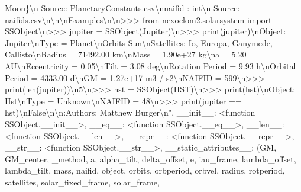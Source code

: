 \documentclass[letterpaper,10pt,english]{sphinxmanual}
\begin{document}
\begin{fulllineitems}
\begin{fulllineitems}
\textquotesingle{}Moon\textquotesingle{}\}\textbackslash{}n    Source: PlanetaryConstants.csv\textbackslash{}nnaifid : int\textbackslash{}n    Source: naifids.csv\textbackslash{}n\textbackslash{}n\textbackslash{}nExamples\textbackslash{}n\sphinxhyphen{}\sphinxhyphen{}\sphinxhyphen{}\sphinxhyphen{}\sphinxhyphen{}\sphinxhyphen{}\sphinxhyphen{}\sphinxhyphen{}\textbackslash{}n\textgreater{}\textgreater{}\textgreater{} from nexoclom2.solarsystem import SSObject\textbackslash{}n\textgreater{}\textgreater{}\textgreater{} jupiter = SSObject(\textquotesingle{}Jupiter\textquotesingle{})\textbackslash{}n\textgreater{}\textgreater{}\textgreater{} print(jupiter)\textbackslash{}nObject: Jupiter\textbackslash{}nType = Planet\textbackslash{}nOrbits Sun\textbackslash{}nSatellites: Io, Europa, Ganymede, Callisto\textbackslash{}nRadius = 71492.00 km\textbackslash{}nMass = 1.90e+27 kg\textbackslash{}na = 5.20 AU\textbackslash{}nEccentricity = 0.05\textbackslash{}nTilt = 3.08 deg\textbackslash{}nRotation Period = 9.93 h\textbackslash{}nOrbital Period = 4333.00 d\textbackslash{}nGM = \sphinxhyphen{}1.27e+17 m3 / s2\textbackslash{}nNAIFID = 599\textbackslash{}n\textgreater{}\textgreater{}\textgreater{} print(len(jupiter))\textbackslash{}n5\textbackslash{}n\textgreater{}\textgreater{}\textgreater{} hst = SSObject(\textquotesingle{}HST\textquotesingle{})\textbackslash{}n\textgreater{}\textgreater{}\textgreater{} print(hst)\textbackslash{}nObject: Hst\textbackslash{}nType = Unknown\textbackslash{}nNAIFID = \sphinxhyphen{}48\textbackslash{}n\textgreater{}\textgreater{}\textgreater{} print(jupiter == hst)\textbackslash{}nFalse\textbackslash{}n\textbackslash{}n:Authors: Matthew Burger\textbackslash{}n", \textquotesingle{}\_\_init\_\_\textquotesingle{}: \textless{}function SSObject.\_\_init\_\_\textgreater{}, \textquotesingle{}\_\_eq\_\_\textquotesingle{}: \textless{}function SSObject.\_\_eq\_\_\textgreater{}, \textquotesingle{}\_\_len\_\_\textquotesingle{}: \textless{}function SSObject.\_\_len\_\_\textgreater{}, \textquotesingle{}\_\_repr\_\_\textquotesingle{}: \textless{}function SSObject.\_\_repr\_\_\textgreater{}, \textquotesingle{}\_\_str\_\_\textquotesingle{}: \textless{}function SSObject.\_\_str\_\_\textgreater{}, \textquotesingle{}\_\_static\_attributes\_\_\textquotesingle{}: (\textquotesingle{}GM\textquotesingle{}, \textquotesingle{}GM\_center\textquotesingle{}, \textquotesingle{}\_method\textquotesingle{}, \textquotesingle{}a\textquotesingle{}, \textquotesingle{}alpha\_tilt\textquotesingle{}, \textquotesingle{}delta\_offset\textquotesingle{}, \textquotesingle{}e\textquotesingle{}, \textquotesingle{}iau\_frame\textquotesingle{}, \textquotesingle{}lambda\_offset\textquotesingle{}, \textquotesingle{}lambda\_tilt\textquotesingle{}, \textquotesingle{}mass\textquotesingle{}, \textquotesingle{}naifid\textquotesingle{}, \textquotesingle{}object\textquotesingle{}, \textquotesingle{}orbits\textquotesingle{}, \textquotesingle{}orbperiod\textquotesingle{}, \textquotesingle{}orbvel\textquotesingle{}, \textquotesingle{}radius\textquotesingle{}, \textquotesingle{}rotperiod\textquotesingle{}, \textquotesingle{}satellites\textquotesingle{}, \textquotesingle{}solar\_fixed\_frame\textquotesingle{}, \textquotesingle{}solar\_frame\textquotesingle{}, 
\end{fulllineitems}
\end{fulllineitems}
\end{document}
